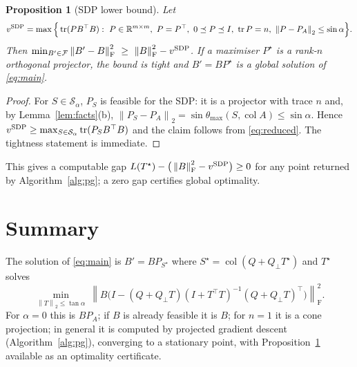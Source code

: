 \documentclass[11pt]{article}
\newtheorem{proposition}[theorem]{Proposition}
\theoremstyle{definition}
\newcommand{\R}{\mathbb{R}}
\newcommand{\col}{\operatorname{col}}
\newcommand{\tr}{\operatorname{tr}}
\newcommand{\norm}[1]{\left\lVert #1 \right\rVert}
\newcommand{\Fro}{\mathrm{F}}
\newcommand{\Qp}{Q_{\perp}}
\newcommand{\Sf}{\mathcal{S}}
\newcommand{\Ff}{\mathcal{F}}
\begin{document}
\begin{proposition}[SDP lower bound]\label{prop:sdp}
Let
\begin{equation}
  v^{\rm SDP}=\max\Big\{\tr(PB^\top B):\ P\in\R^{m\times m},\ P=P^\top,\ 0\preceq P\preceq I,\ \tr P=n,\ \norm{P-P_A}_2\le\sin\alpha\Big\}.
\end{equation}
Then $\min_{B'\in\Ff}\norm{B'-B}_\Fro^2\ \ge\ \norm B_\Fro^2-v^{\rm SDP}$.
If a maximiser $P^\star$ is a rank-$n$ orthogonal projector, the bound is tight and $B'=BP^\star$ is a global solution of \eqref{eq:main}.
\end{proposition}
\begin{proof}
For $S\in\Sf_\alpha$, $P_S$ is feasible for the SDP: it is a projector with trace $n$ and, by Lemma~\ref{lem:facts}(b), $\norm{P_S-P_A}_2=\sin\theta_{\max}(S,\col A)\le\sin\alpha$. Hence $v^{\rm SDP}\ge\max_{S\in\Sf_\alpha}\tr(P_SB^\top B)$ and the claim follows from \eqref{eq:reduced}. The tightness statement is immediate.
\end{proof}
This gives a computable gap $L(T^\star)-\big(\norm B^2_\Fro-v^{\rm SDP}\big)\ge0$ for any point returned by Algorithm~\ref{alg:pg}; a zero gap certifies global optimality.

\section{Summary}

The solution of \eqref{eq:main} is $B'=BP_{S^\star}$ where $S^\star=\col(Q+\Qp T^\star)$ and $T^\star$ solves
\[
\min_{\norm T_2\le\tan\alpha}\ \norm{B\big(I-(Q+\Qp T)(I+T^\top T)^{-1}(Q+\Qp T)^\top\big)}_\Fro^2 .
\]
For $\alpha=0$ this is $BP_A$; if $B$ is already feasible it is $B$; for $n=1$ it is a cone projection; in general it is computed by projected gradient descent (Algorithm~\ref{alg:pg}), converging to a stationary point, with Proposition~\ref{prop:sdp} available as an optimality certificate.
\end{document}
